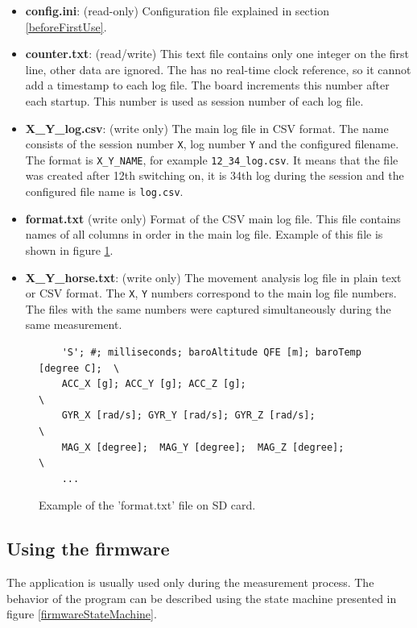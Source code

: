 \begin{itemize}
    \item \textbf{config.ini}: (read-only) Configuration file explained in section \ref{beforeFirstUse}.
    \item \textbf{counter.txt}: (read/write) This text file contains only one integer on the first line, other data are ignored. The  has no real-time clock reference, so it cannot add a timestamp to each log file. The board increments this number after each startup. This number is used as session number of each log file.
    \item \textbf{X\_Y\_log.csv}: (write only) The main log file in CSV format. The name consists of the session number \texttt{X}, log number \texttt{Y} and the configured filename. The format is \texttt{X\_Y\_NAME}, for example \texttt{12\_34\_log.csv}. It means that the file was created after 12th switching on, it is 34th log during the session and the configured file name is \texttt{log.csv}.
    \item \textbf{format.txt} (write only) Format of the CSV main log file. This file contains names of all columns in order in the main log file. Example of this file is shown in figure \ref{formatFile}.
    \item \textbf{X\_Y\_horse.txt}: (write only) The movement analysis log file in plain text or CSV format. The \texttt{X}, \texttt{Y} numbers correspond to the main log file numbers. The files with the same numbers were captured simultaneously during the same measurement.
\end{itemize}

\begin{figure}
    \centering
    \caption{Example of the 'format.txt' file on SD card.}
    \label{formatFile}
    \begin{verbatim}
    'S'; #; milliseconds; baroAltitude QFE [m]; baroTemp [degree C];  \
    ACC_X [g]; ACC_Y [g]; ACC_Z [g];                                  \
    GYR_X [rad/s]; GYR_Y [rad/s]; GYR_Z [rad/s];                      \
    MAG_X [degree];  MAG_Y [degree];  MAG_Z [degree];                 \
    ...
    \end{verbatim}
\end{figure}

\subsection{Using the firmware}
The application is usually used only during the measurement process. The behavior of the program can be described using the state machine presented in figure \ref{firmwareStateMachine}.

